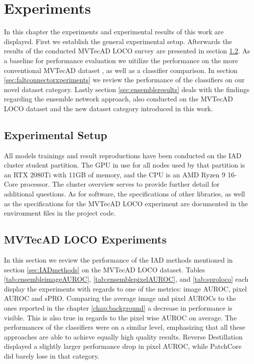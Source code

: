 \chapter{Experiments}
\label{chap:experiments}

In this chapter the experiments and experimental results of this work are displayed. First we establish the general experimental setup. Afterwards the results of the conducted MVTecAD LOCO \cite{LOCODentsAndScratchesBergmann2022}
survey are presented in section \ref{sec:locoxperiments}. As a baseline for performance evaluation we uitilize the performance on the more conventional MVTecAD dataset \cite{MVTEC_Bergmann_2021}, 
as well as a classifier comparison. In section \ref{sec:faltconnectorxperiments} we review the performance of the classifiers on our novel dataset category. Lastly section \ref{sec:ensembleresults} 
deals with the findings regarding the ensemble network approach, also conducted on the MVTecAD LOCO dataset and the new dataset category introduced in this work.


\section{Experimental Setup}
\label{sec:experimentsetup}

All models trainings and result reproductions have been conducted on the IAD cluster student partition. The GPU in use for all nodes used by that partition is an 
RTX 2080Ti with 11GB of memory, and the CPU is an AMD Ryzen 9 16-Core processor. The cluster overview \cite{clusterdocs} serves to provide further detail for additional questions. 
As for software, the specifications of other libraries, as well as the specifications for the MVTecAD LOCO experiment are documented in the 
environment files in the project code.



\section{MVTecAD LOCO Experiments}
\label{sec:locoxperiments}

In this section we review the performance of the IAD methods mentioned in section \ref{sec:IADmethods} on the MVTecAD LOCO \cite{LOCODentsAndScratchesBergmann2022} 
dataset. Tables \ref{tab:ensembleimageAUROC}, \ref{tab:ensemblepixelAUROC}, and \ref{tab:sproloco} each display the experiments with regards to one of the metrics: image AUROC, pixel AUROC and sPRO. \newline
Comparing the average image and pixel AUROCs to the ones reported in the chapter \ref{chap:background} a decrease in performance is visible. 
This is also true in regards to the pixel wise AUROC on average. The performances of the classifiers were on a similar level, emphasizing that all these approaches are 
able to achieve equally high quality results. Reverse Destillation \cite{revdist2023} displayed a slightly larger performance drop in pixel AUROC, while PatchCore \cite{patchCore2022} 
did barely lose in that category.

